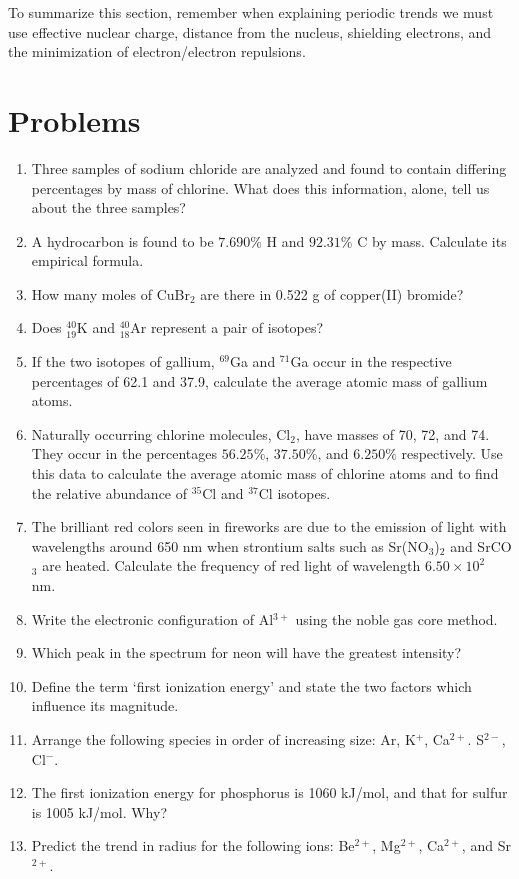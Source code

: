 \documentclass[../chem.tex]{subfiles}
\begin{document}
To summarize this section, remember when explaining periodic trends we must use effective nuclear charge, distance from the nucleus, shielding electrons, and the minimization of electron/electron repulsions.

\section*{Problems}
\begin{enumerate}
    \item Three samples of sodium chloride are analyzed and found to contain differing percentages by mass of chlorine. What does this information, alone, tell us about the three samples?
    \item A hydrocarbon is found to be $7.690\%$ H and $92.31\%$ C by mass. Calculate its empirical formula.
    \item How many moles of CuBr$_2$ are there in 0.522 g of copper(II) bromide?
    \item Does $^{40}_{19}$K and $^{40}_{18}$Ar represent a pair of isotopes?
    \item If the two isotopes of gallium, $^{69}$Ga and $^{71}$Ga occur in the respective percentages of 62.1 and 37.9, calculate the average atomic mass of gallium atoms.
    \item Naturally occurring chlorine molecules, Cl$_2$, have masses of 70, 72, and 74. They occur in the percentages $56.25\%$, $37.50\%$, and $6.250\%$ respectively. Use this data to calculate the average atomic mass of chlorine atoms and to find the relative abundance of $^{35}$Cl and $^{37}$Cl isotopes.
    \item The brilliant red colors seen in fireworks are due to the emission of light with wavelengths around 650 nm when strontium salts such as Sr(NO$_3$)$_2$ and SrCO$_3$ are heated. Calculate the frequency of red light of wavelength $6.50\times 10^2$ nm.
    \item Write the electronic configuration of Al$^{3+}$ using the noble gas core method.
    \item Which peak in the spectrum for neon will have the greatest intensity?
    \item Define the term `first ionization energy' and state the two factors which influence its magnitude.
    \item Arrange the following species in order of increasing size: Ar, K$^+$, Ca$^{2+}$. S$^{2-}$, Cl$^-$.
    \item The first ionization energy for phosphorus is 1060 kJ/mol, and that for sulfur is 1005 kJ/mol. Why?
    \item Predict the trend in radius for the following ions: Be$^{2+}$, Mg$^{2+}$, Ca$^{2+}$, and Sr$^{2+}$.
\end{enumerate}
\end{document}
